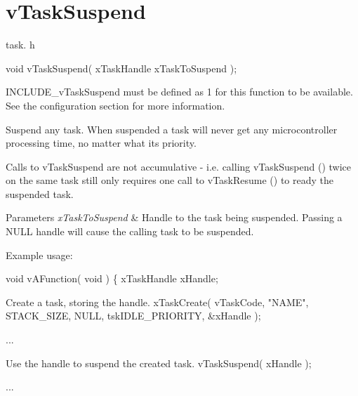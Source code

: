 \hypertarget{group__v_task_suspend}{\section{v\-Task\-Suspend}
\label{group__v_task_suspend}
}
task. h 
\begin{DoxyPre}void vTaskSuspend( xTaskHandle xTaskToSuspend );\end{DoxyPre}


I\-N\-C\-L\-U\-D\-E\-\_\-v\-Task\-Suspend must be defined as 1 for this function to be available. See the configuration section for more information.

Suspend any task. When suspended a task will never get any microcontroller processing time, no matter what its priority.

Calls to v\-Task\-Suspend are not accumulative -\/ i.\-e. calling v\-Task\-Suspend () twice on the same task still only requires one call to v\-Task\-Resume () to ready the suspended task.


\begin{DoxyParams}{Parameters}
{\em x\-Task\-To\-Suspend} & Handle to the task being suspended. Passing a N\-U\-L\-L handle will cause the calling task to be suspended.\\
\hline
\end{DoxyParams}
Example usage\-: 
\begin{DoxyPre}
 void vAFunction( void )
 \{
 xTaskHandle xHandle;\end{DoxyPre}



\begin{DoxyPre}Create a task, storing the handle.
         xTaskCreate( vTaskCode, "NAME", STACK\_SIZE, NULL, tskIDLE\_PRIORITY, \&xHandle );\end{DoxyPre}



\begin{DoxyPre}...\end{DoxyPre}



\begin{DoxyPre}Use the handle to suspend the created task.
         vTaskSuspend( xHandle );\end{DoxyPre}



\begin{DoxyPre}...\end{DoxyPre}



